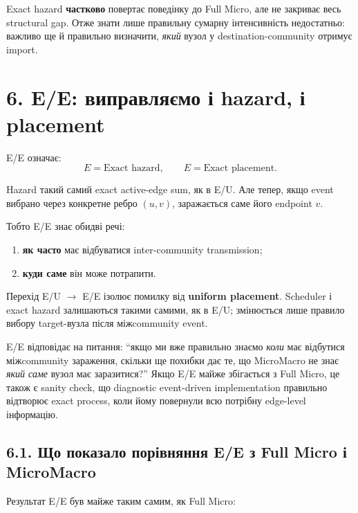 \documentclass[11pt,a4paper]{article}
\begin{document}
\begin{tcolorbox}[colback=soft,colframe=purple,title=Головний результат E/U]
Exact hazard \textbf{частково} повертає поведінку до Full Micro, але не закриває весь structural gap. Отже знати лише правильну сумарну інтенсивність недостатньо: важливо ще й правильно визначити, \textit{який} вузол у destination-community отримує import.
\end{tcolorbox}

\section*{6. E/E: виправляємо і hazard, і placement}

E/E означає:
\[
 \boxed{E=\text{Exact hazard}},\qquad
 \boxed{E=\text{Exact placement}}.
\]

Hazard такий самий exact active-edge sum, як в E/U. Але тепер, якщо event вибрано через конкретне ребро $(u,v)$, заражається саме його endpoint $v$.

Тобто E/E знає обидві речі:
\begin{enumerate}[nosep]
\item \textbf{як часто} має відбуватися inter-community transmission;
\item \textbf{куди саме} він може потрапити.
\end{enumerate}

Перехід E/U $\to$ E/E ізолює помилку від \textbf{uniform placement}. Scheduler і exact hazard залишаються такими самими, як в E/U; змінюється лише правило вибору target-вузла після міжcommunity event.

\begin{tcolorbox}[colback=white,colframe=exact,title=Що саме перевіряє E/E?]
E/E відповідає на питання: ``якщо ми вже правильно знаємо \textit{коли} має відбутися міжcommunity зараження, скільки ще похибки дає те, що MicroMacro не знає \textit{який саме} вузол має заразитися?'' Якщо E/E майже збігається з Full Micro, це також є sanity check, що diagnostic event-driven implementation правильно відтворює exact process, коли йому повернули всю потрібну edge-level інформацію.
\end{tcolorbox}

\subsection*{6.1. Що показало порівняння E/E з Full Micro і MicroMacro}

Результат E/E був майже таким самим, як Full Micro:
\end{document}
